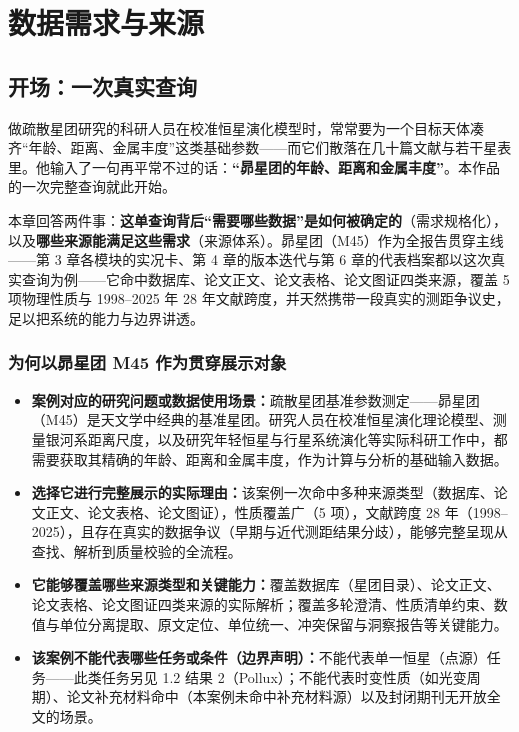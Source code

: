 \section{数据需求与来源}

\subsection{开场：一次真实查询}

做疏散星团研究的科研人员在校准恒星演化模型时，常常要为一个目标天体凑齐“年龄、距离、金属丰度”这类基础参数——而它们散落在几十篇文献与若干星表里。他输入了一句再平常不过的话：\textbf{“昴星团的年龄、距离和金属丰度”}。本作品的一次完整查询就此开始。

本章回答两件事：\textbf{这单查询背后“需要哪些数据”是如何被确定的}（需求规格化），以及\textbf{哪些来源能满足这些需求}（来源体系）。昴星团（M45）作为全报告贯穿主线——第 3 章各模块的实况卡、第 4 章的版本迭代与第 6 章的代表档案都以这次真实查询为例——它命中数据库、论文正文、论文表格、论文图证四类来源，覆盖 5 项物理性质与 1998--2025 年 28 年文献跨度，并天然携带一段真实的测距争议史，足以把系统的能力与边界讲透。

\subsubsection{为何以昴星团 M45 作为贯穿展示对象}

\begin{itemize}[leftmargin=1.2em,itemsep=2pt]
\item \textbf{案例对应的研究问题或数据使用场景：}疏散星团基准参数测定——昴星团（M45）是天文学中经典的基准星团。研究人员在校准恒星演化理论模型、测量银河系距离尺度，以及研究年轻恒星与行星系统演化等实际科研工作中，都需要获取其精确的年龄、距离和金属丰度，作为计算与分析的基础输入数据。
\item \textbf{选择它进行完整展示的实际理由：}该案例一次命中多种来源类型（数据库、论文正文、论文表格、论文图证），性质覆盖广（5 项），文献跨度 28 年（1998--2025），且存在真实的数据争议（早期与近代测距结果分歧），能够完整呈现从查找、解析到质量校验的全流程。
\item \textbf{它能够覆盖哪些来源类型和关键能力：}覆盖数据库（星团目录）、论文正文、论文表格、论文图证四类来源的实际解析；覆盖多轮澄清、性质清单约束、数值与单位分离提取、原文定位、单位统一、冲突保留与洞察报告等关键能力。
\item \textbf{该案例不能代表哪些任务或条件（边界声明）：}不能代表单一恒星（点源）任务——此类任务另见 1.2 结果 2（Pollux）；不能代表时变性质（如光变周期）、论文补充材料命中（本案例未命中补充材料源）以及封闭期刊无开放全文的场景。
\end{itemize}

